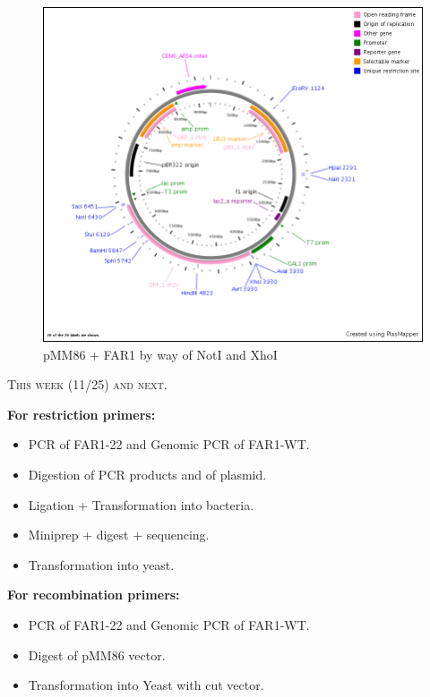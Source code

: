 \documentclass{beamer}
\begin{document}
\begin{frame}
    \begin{figure}[ht!]
        \centering
        \includegraphics[width=.8\textwidth]{../Documents/plasMap_pGALFARwt.png}
        \caption{pMM86 + FAR1 by way of NotI and XhoI}
        \label{fig:ligc}
    \end{figure}
\end{frame}

\begin{frame}
    \begin{center}
        {\large \textsc{This week (11/25) and next.}}
    \end{center}
    \textbf{For restriction primers:}\\
    \begin{itemize}
        \item PCR of FAR1-22 and Genomic PCR of FAR1-WT.
        \item Digestion of PCR products and of plasmid.
        \item Ligation + Transformation into bacteria.
        \item Miniprep + digest + sequencing.
        \item Transformation into yeast.
    \end{itemize}

    \textbf{For recombination primers:}\\
    \begin{itemize}
        \item PCR of FAR1-22 and Genomic PCR of FAR1-WT.
        \item Digest of pMM86 vector.
        \item Transformation into Yeast with cut vector.
    \end{itemize}
\end{frame}
\end{document}
